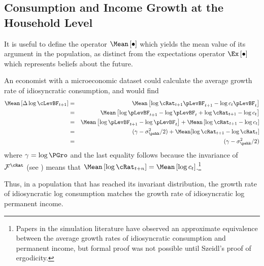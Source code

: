 \documentclass[titlepage]{\econtex}\providecommand{\texname}{BufferStockTheory}
\begin{document}
\hypertarget{Consumption-and-Income-Growth-at-the-Household-Level}{}
\subsection{Consumption and Income Growth at the Household Level}

It is useful to define the operator $\Mean\left[\bullet\right]$
which yields the mean value of its argument in the population, as
distinct from the expectations operator $\Ex\left[\bullet\right]$ which represents beliefs about the
future.

An economist with a microeconomic dataset could calculate the average
growth rate of idiosyncratic consumption, and would find
\begin{eqnarray*}
\Mean\left[\Delta \log \cLevBF_{t+1}\right] & = & \Mean\left[ \log {\cRat}%
_{t+1}\pLevBF_{t+1} - \log c_{t}\pLevBF_{t}\right]  \notag \\
& = & \Mean\left[ \log \pLevBF_{t+1}- \log \pLevBF_{t} + \log {\cRat}_{t+1} - \log c_{t}\right]  \notag \\
& = & \Mean\left[ \log \pLevBF_{t+1}- \log \pLevBF_{t}\right] + \Mean\left[ \log {\cRat}_{t+1} - \log c_{t}\right]  \notag \\
& = & (\gamma - \sigma^{2}_{\pshk}/2) + \Mean[\log \cRat_{t+1} - \log \cRat_{t}] \\
& = & (\gamma - \sigma^{2}_{\pshk}/2)
\end{eqnarray*}
where $\gamma=\log \PGro$ and the last equality follows because the invariance of
$\mathcal{F}^{\cRat}$ (see \cite{szeidlInvariant}) means that $\Mean\left[ \log
  {\cRat}_{t+n}\right] = \Mean\left[ \log
  c_{t}\right]$.\footnote{Papers in the simulation literature have
  observed an approximate equivalence between the average growth rates
  of idiosyncratic consumption and permanent income, but formal proof
  was not possible until Szeidl's proof of ergodicity.}

Thus, in a population that has reached its invariant distribution, the growth
rate of idiosyncratic log consumption matches the growth rate of idiosyncratic log permanent income.
\end{document}
